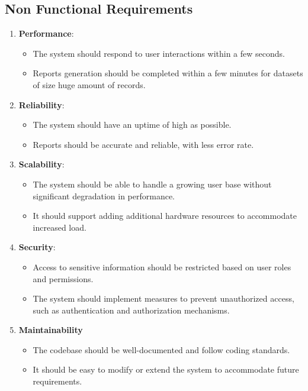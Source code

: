 \subsection{Non Functional Requirements}
\begin{enumerate}[label=\textbf{NF\arabic*.}, leftmargin=*] %
    \item \textbf{Performance}:
    \begin{itemize}[label=--, leftmargin=*] %
        \item The system should respond to user interactions within a few seconds.
        \item Reports generation should be completed within a few  minutes for datasets of size huge amount of records.
    \end{itemize}
    \clearpage
    \item \textbf{Reliability}:
    \begin{itemize}[label=--, leftmargin=*]
        \item The system should have an uptime of high as possible.
        \item Reports should be accurate and reliable, with less error rate.
    \end{itemize}
    
    \item \textbf{Scalability}:
    \begin{itemize}[label=--, leftmargin=*]
        \item The system should be able to handle a growing user base without significant degradation in performance.
        \item It should support adding additional hardware resources to accommodate increased load.
    \end{itemize}

    \item \textbf{Security}:
    \begin{itemize}[label=--, leftmargin=*]
        \item Access to sensitive information should be restricted based on user roles and permissions.
        \item The system should implement measures to prevent unauthorized access, such as authentication and authorization mechanisms.
    \end{itemize}

    \item \textbf{Maintainability}
    \begin{itemize}[label=--, leftmargin=*]
        \item The codebase should be well-documented and follow coding standards.
        \item It should be easy to modify or extend the system to accommodate future requirements.
    \end{itemize}
\end{enumerate}
\clearpage
